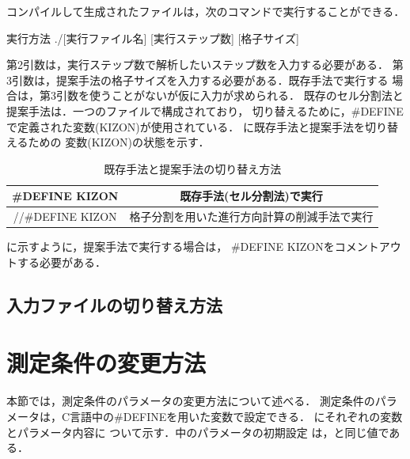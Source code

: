 コンパイルして生成されたファイルは，次のコマンドで実行することができる．
\begin{itembox}[l]{実行方法}
./[実行ファイル名] [実行ステップ数] [格子サイズ]
\end{itembox}
第2引数は，実行ステップ数で解析したいステップ数を入力する必要がある．
第3引数は，提案手法の格子サイズを入力する必要がある．既存手法で実行する
場合は，第3引数を使うことがないが仮に入力が求められる．
既存のセル分割法と提案手法は．一つのファイルで構成されており，
切り替えるために，\#DEFINEで定義された変数(KIZON)が使用されている．
に既存手法と提案手法を切り替えるための
変数(KIZON)の状態を示す．
%
\begin{table}[H]
  \begin{center}
    \caption{既存手法と提案手法の切り替え方法}
    \label{tb:toggle_kizon}
    \begin{tabular}{c|c}
      \hline \hline
      \#DEFINE KIZON     & 既存手法(セル分割法)で実行 \\ \hline
      //\#DEFINE KIZON & 格子分割を用いた進行方向計算の削減手法で実行\\ \hline
    \end{tabular}
  \end{center}
\end{table}
%
に示すように，提案手法で実行する場合は，
\#DEFINE KIZONをコメントアウトする必要がある．

\subsection{入力ファイルの切り替え方法}


\clearpage
\section{測定条件の変更方法}
本節では，測定条件のパラメータの変更方法について述べる．
測定条件のパラメータは，C言語中の\#DEFINEを用いた変数で設定できる．
にそれぞれの変数とパラメータ内容に
ついて示す．中のパラメータの初期設定
は，と同じ値である．


